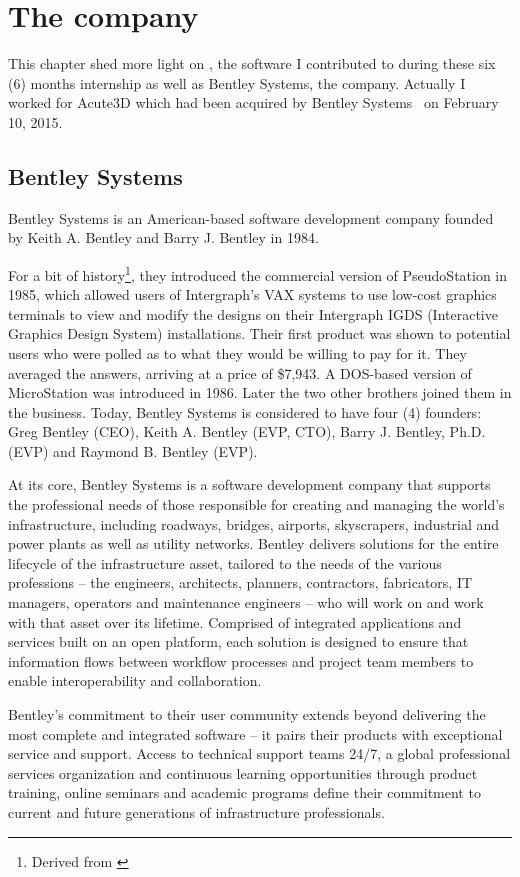 \chapter{The company}
\label{ch:company}

This chapter shed more light on \CC, the software I contributed to during these six (6) months internship as well as Bentley Systems, the company. Actually I worked for Acute3D which had been acquired by Bentley Systems~\cite{acute} on February 10, 2015.


\section{Bentley Systems}
Bentley Systems is an American-based software development company founded by Keith A. Bentley and Barry J. Bentley in 1984.

For a bit of history\footnote{Derived from \cite{bentley}}, they introduced the commercial version of PseudoStation in 1985, which allowed users of Intergraph's VAX systems to use low-cost graphics terminals to view and modify the designs on their Intergraph IGDS (Interactive Graphics Design System) installations. Their first product was shown to potential users who were polled as to what they would be willing to pay for it. They averaged the answers, arriving at a price of \$7,943. A DOS-based version of MicroStation was introduced in 1986. Later the two other brothers joined them in the business. Today, Bentley Systems is considered to have four (4) founders: Greg Bentley (CEO), Keith A. Bentley (EVP, CTO), Barry J. Bentley, Ph.D. (EVP) and Raymond B. Bentley (EVP).

At its core, Bentley Systems is a software development company that supports the professional needs of those responsible for creating and managing the world’s infrastructure, including roadways, bridges, airports, skyscrapers, industrial and power plants as well as utility networks.  Bentley delivers solutions for the entire lifecycle of the infrastructure asset, tailored to the needs of the various professions -- the engineers, architects, planners, contractors, fabricators, IT managers,
 operators and maintenance engineers -- who will work on and work with that asset over its lifetime. Comprised of integrated applications and services built on an open platform, each solution is designed to ensure that information flows between workflow processes and project team members to enable interoperability and collaboration.

Bentley’s commitment to their user community extends beyond delivering the most complete and integrated software -- it pairs their products with exceptional service and support. Access to technical support teams 24/7, a global professional services organization and continuous learning opportunities through product training, online seminars and academic programs define their commitment to current and future generations of infrastructure professionals.

